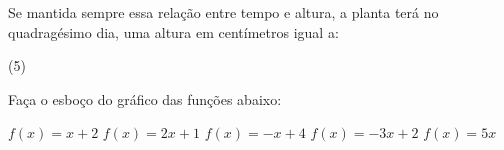 \documentclass[a4paper,11pt,addpoints]{exam}
\begin{document}
\begin{questions}
    Se mantida sempre essa relação entre tempo e altura, a planta terá no
    quadragésimo dia, uma altura em centímetros igual a:

    \begin{tasks}(5)
    \end{tasks}

    \question[2]

    Faça o esboço do gráfico das funções abaixo:

    \begin{tasks}
        \task $f(x) = x + 2$
        \task $f(x) = 2x + 1$
        \task $f(x) = -x + 4$
        \task $f(x) = -3x + 2$
        \task $f(x) = 5x$
    \end{tasks}

\end{questions}
\end{document}
